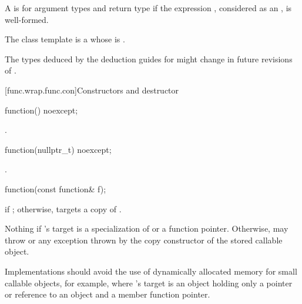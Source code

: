 \pnum
{}%
A  
is  for argument
types 
and return type 
if the expression
,
considered as an , is
well-formed.

\pnum
The  class template is a
 whose 
is .

\pnum
\begin{note}
The types deduced by the deduction guides for 
might change in future revisions of \Cpp{}.
\end{note}

[func.wrap.func.con]{Constructors and destructor}

%
\begin{itemdecl}
function() noexcept;
\end{itemdecl}

\begin{itemdescr}
\pnum
\ensures
{}.
\end{itemdescr}

%
\begin{itemdecl}
function(nullptr_t) noexcept;
\end{itemdecl}

\begin{itemdescr}
\pnum
\ensures
{}.
\end{itemdescr}

%
\begin{itemdecl}
function(const function& f);
\end{itemdecl}

\begin{itemdescr}
\pnum
\ensures
{} if ; otherwise,
 targets a copy of .

\pnum
\throws
Nothing if 's target is
a specialization of  or
a function pointer. Otherwise, may throw 
or any exception thrown by the copy constructor of the stored callable object.

\pnum
\recommended
Implementations should avoid the use of
dynamically allocated memory for small callable objects, for example, where
's target is an object holding only a pointer or reference
to an object and a member function pointer.
\end{itemdescr}

